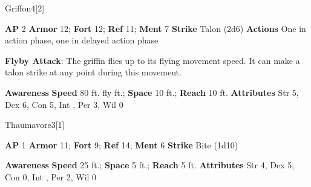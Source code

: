 \begin{monsection}{Griffon}{4}[2]
\vspace{-1em}\vspace{-1em}
\begin{spellcontent}
\begin{spelltargetinginfo}
{\textbf{AP} 2}
\pari \textbf{Armor} 12;
\textbf{Fort} 12;
\textbf{Ref} 11;
\textbf{Ment} 7
\pari \textbf{Strike} Talon  (2d6)
\pari \textbf{Actions} One in action phase, one in delayed action phase
\end{spelltargetinginfo}
\begin{spelleffects}
\pari
\textbf{Flyby Attack}:
The griffin flies up to its flying movement speed.
It can make a talon strike at any point during this movement.
\end{spelleffects}
\end{spellcontent}
\begin{spellsubcontent}
\begin{spellfooter}
\pari \textbf{Awareness} 
\pari \textbf{Speed} 80 ft. fly ft.;
\textbf{Space} 10 ft.;
\textbf{Reach} 10 ft.
\pari \textbf{Attributes}
Str 5,
Dex 6,
Con 5,
Int ,
Per 3,
Wil 0
\end{spellfooter}
\end{spellsubcontent}
\end{monsection}
\begin{monsection}{Thaumavore}{3}[1]
\vspace{-1em}\vspace{-1em}
\begin{spellcontent}
\begin{spelltargetinginfo}
{\textbf{AP} 1}
\pari \textbf{Armor} 11;
\textbf{Fort} 9;
\textbf{Ref} 14;
\textbf{Ment} 6
\pari \textbf{Strike} Bite  (1d10)
\end{spelltargetinginfo}
\end{spellcontent}
\begin{spellsubcontent}
\begin{spellfooter}
\pari \textbf{Awareness} 
\pari \textbf{Speed} 25 ft.;
\textbf{Space} 5 ft.;
\textbf{Reach} 5 ft.
\pari \textbf{Attributes}
Str 4,
Dex 5,
Con 0,
Int ,
Per 2,
Wil 0
\end{spellfooter}
\end{spellsubcontent}
\end{monsection}
